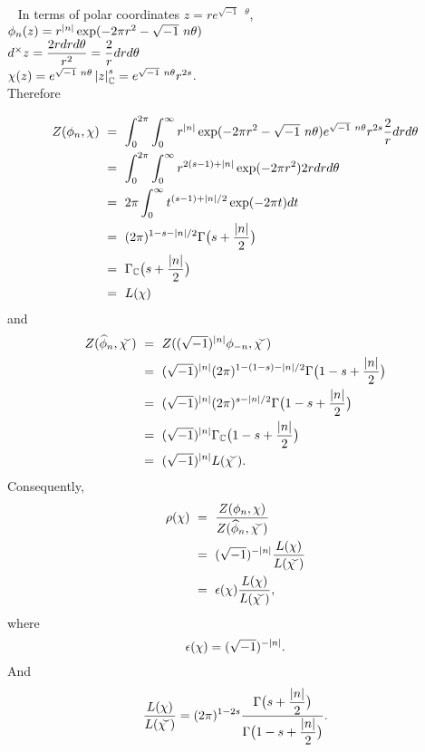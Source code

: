 \vspace{0.1cm}


\begin{x}{\small\bf {}} \ %
In terms of polar coordinates $z = r e^{\sqrt{-1} \text{ } \theta}$,\\

\qquad\textbullet \quad$\phi_n(z) = r^{\left\vert n\right\vert} \exp (-2\pi r^2 - \sqrt{-1} \ n \theta)$\\

\qquad\textbullet \quad$d^\times z =\displaystyle\frac{2 r dr d \theta}{r^2} = \displaystyle\frac{2}{r} dr d \theta$\\

\qquad\textbullet \quad$\chi(z) = e^{\sqrt{-1} \  n \theta} \left\vert z\right\vert_{\mathbb{C}}^s = e^{\sqrt{-1} \ n \theta} r^{2s}$.\\

Therefore


\begin{align*}
Z(\phi_n,\chi) \ 	
&=\  \int_0^{2\pi} \int_0^\infty r^{\left\vert n\right\vert} \exp(-2\pi r^2 - \sqrt{-1} \  n \theta) e^{\sqrt{-1} \ n \theta} r^{2s} \frac{2}{r} dr d\theta\\	
&=\  \int_0^{2\pi} \int_0^\infty r^{2(s-1) + \left\vert n\right\vert} \exp(-2\pi r^2) 2r dr d\theta\\		
&=\  2\pi \int_0^\infty t^{(s-1) + \left\vert n\right\vert/2} \exp(-2\pi t) dt\\
&=\  (2\pi)^{1 - s - \left\vert n\right\vert/2} \Gamma\bigl(s + \frac{\left\vert n\right\vert}{2}\bigr)\\ 
&=\  \Gamma_{\mathbb{C}}\bigl(s + \frac{\left\vert n\right\vert}{2}\bigr)\\
&=\  L(\chi)\\  
\end{align*}
and
\begin{align*}
Z(\widehat{\phi}_n,\widecheck{\chi}) \ 	
&=\  Z((\sqrt{-1})^{\abs{n}} \phi_{-n}, \widecheck{\chi})\\	
&=\  (\sqrt{-1})^{\abs{n}} (2\pi)^{1 - (1 - s)- \abs{n}/2} \Gamma\bigl(1 - s + \frac{\abs{n}}{2}\bigr)\\		
&=\  (\sqrt{-1})^{\abs{n}} (2\pi)^{s - \abs{n}/2} \Gamma\bigl(1 - s + \frac{\abs{n}}{2}\bigr)\\	
&=\  (\sqrt{-1})^{\abs{n}}  \Gamma_\C\bigl(1 - s + \frac{\abs{n}}{2}\bigr)\\
&=\  (\sqrt{-1})^{\abs{n}}  L(\widecheck{\chi}).
\end{align*}
Consequently, 
\begin{align*}
\rho(\chi)	\ 	
&=\  \frac{Z(\phi_n,\chi)}{Z(\widehat{\phi}_n,\widecheck{\chi}) }\\	
&=\  (\sqrt{-1})^{-\abs{n}} \frac{L(\chi)}{L(\widecheck{\chi})}\\		
&=\  \epsilon(\chi)\frac{L(\chi)}{L(\widecheck{\chi})},		
\end{align*}
where
\[
\epsilon(\chi) = (\sqrt{-1})^{-\left\vert n\right\vert}.
\]
And
\[
\frac{L(\chi)}{L(\widecheck{\chi})} = (2\pi)^{1 - 2s} 
\frac{\Gamma\bigl(s + \ds\frac{\abs{n}}{2}\bigr)}{\Gamma\bigl(1-s + \ds\frac{\abs{n}}{2}\bigr)}.
\]
\end{x}

